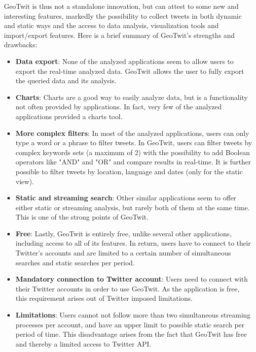 \documentclass[a4paper,11pt]{report}
\begin{document}
GeoTwit is thus not a standalone innovation, but can attest to some new and interesting features, markedly the possibility to collect tweets in both dynamic and static ways and the access to data analysis, visualization tools and import/export features. Here is a brief summary of GeoTwit's \color{ForestGreen}strengths \color{black}and \color{BrickRed}drawbacks\color{black}:\color{ForestGreen}
\renewcommand{\labelitemi}{\faicon{check}}
\begin{itemize}
	\item \textbf{Data export}: None of the analyzed applications seem to allow users to export the real-time analyzed data. GeoTwit allows the user to fully export the queried data and its analysis.
	\item \textbf{Charts}: Charts are a good way to easily analyze data, but is a functionality not often provided by applications. In fact, very few of the analyzed applications provided a charts tool.
	\item \textbf{More complex filters}: In most of the analyzed applications, users can only type a word or a phrase to filter tweets. In GeoTwit, users can filter tweets by complex keywords sets (a maximum of 2) with the possibility to add Boolean operators like "AND" and "OR" and compare results in real-time. It is further possible to filter tweets by location, language and dates (only for the static view).
	\item \textbf{Static and streaming search}: Other similar applications seem to offer either static or streaming analysis, but rarely both of them at the same time. This is one of the strong points of GeoTwit.
	\item \textbf{Free}: Lastly, GeoTwit is entirely free, unlike several other applications, including access to all of its features. In return, users have to connect to their Twitter's accounts and are limited to a certain number of simultaneous searches and static searches per period.\color{BrickRed}\renewcommand{\labelitemi}{\faicon{times}}
	\item \textbf{Mandatory connection to Twitter account}: Users need to connect with their Twitter accounts in order to use GeoTwit. As the application is free, this requirement arises out of Twitter imposed limitations.
	\item \textbf{Limitations}: Users cannot not follow more than two simultaneous streaming processes per account, and have an upper limit to possible static search per period of time. This disadvantage arises from the fact that GeoTwit has free and thereby a limited access to Twitter API.

\end{itemize}
\end{document}
